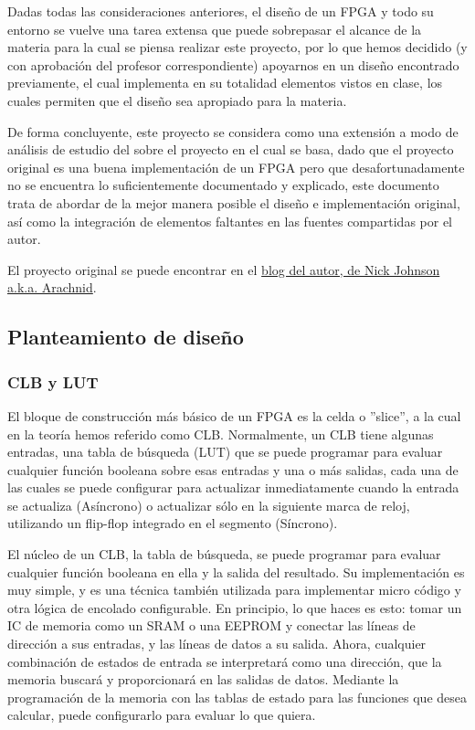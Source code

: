 \documentclass[12pt]{article}
\begin{document}
Dadas todas las consideraciones anteriores, el diseño de un FPGA y todo su entorno se vuelve una tarea extensa que puede sobrepasar el alcance de la materia para la cual se piensa realizar este proyecto, por lo que hemos decidido (y con aprobación del profesor correspondiente) apoyarnos en un diseño encontrado previamente, el cual implementa en su totalidad elementos vistos en clase, los cuales permiten que el diseño sea apropiado para la materia.  

De forma concluyente, este proyecto se considera como una extensión a modo de análisis de estudio del sobre el proyecto en el cual se basa, dado que el proyecto original es una buena implementación de un FPGA pero que desafortunadamente no se encuentra lo suficientemente documentado y explicado, este documento trata de abordar de la mejor manera posible el diseño e implementación original, así como la integración de elementos faltantes en las fuentes compartidas por el autor.

El proyecto original se puede encontrar en el \cite{ref:web2}\href{http://blog.notdot.net/2012/10/Build-your-own-FPGA}{blog del autor, de Nick Johnson a.k.a. Arachnid}.

\subsection{Planteamiento de diseño}

\subsubsection{CLB y LUT}

El bloque de construcción más básico de un FPGA es la celda o ''slice'', a la cual en la teoría hemos referido como CLB. Normalmente, un CLB tiene algunas entradas, una tabla de búsqueda (LUT) que se puede programar para evaluar cualquier función booleana sobre esas entradas y una o más salidas, cada una de las cuales se puede configurar para actualizar inmediatamente cuando la entrada se actualiza (Asíncrono) o actualizar sólo en la siguiente marca de reloj, utilizando un flip-flop integrado en el segmento (Síncrono). 
 
El núcleo de un CLB, la tabla de búsqueda, se puede programar para evaluar cualquier función booleana en ella y la salida del resultado. Su implementación es muy simple, y es una técnica también utilizada para implementar micro código y otra lógica de encolado configurable. En principio, lo que haces es esto: tomar un IC de memoria como un SRAM o una EEPROM y conectar las líneas de dirección a sus entradas, y las líneas de datos a su salida. Ahora, cualquier combinación de estados de entrada se interpretará como una dirección, que la memoria buscará y proporcionará en las salidas de datos. Mediante la programación de la memoria con las tablas de estado para las funciones que desea calcular, puede configurarlo para evaluar lo que quiera. 
 
\end{document}
